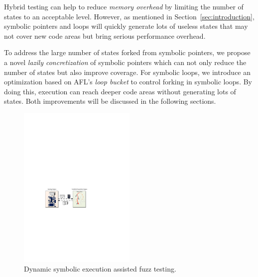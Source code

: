 Hybrid testing can help to reduce \textit{memory overhead} by limiting the number of states to an acceptable level. However, as mentioned in Section~\ref{sec:introduction}, symbolic pointers and loops will quickly generate lots of useless states that may not cover new code areas but bring serious performance overhead.

To address the large number of states forked from symbolic pointers, we propose a novel \textit{lazily concretization} of symbolic pointers which can not only reduce the number of states but also improve coverage. 
For symbolic loops, we introduce an optimization based on AFL's \textit{loop bucket} to control forking in symbolic loops. By doing this, execution can reach deeper code areas without generating lots of states.
Both improvements will be discussed in the following sections.

\begin{figure}
\centering
\includegraphics[width=0.5\textwidth]{figures/s2e-assist.pdf} 
\caption{Dynamic symbolic execution assisted fuzz testing.}\label{s2e-assist}
\end{figure}

